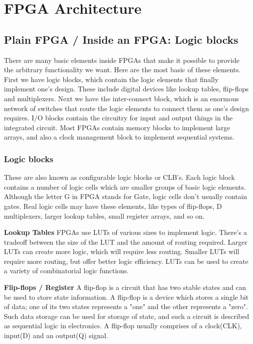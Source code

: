 \section{FPGA Architecture}


\subsection{Plain FPGA / Inside an FPGA: Logic blocks}

There are many basic elements inside FPGAs that make it possible to provide the arbitrary functionality we want. Here are the most basic of these elements. First we have logic blocks, which contain the logic elements that finally implement one's design. These include digital devices like lookup tables, flip-flops and multiplexers. Next we have the inter-connect block, which is an enormous network of switches that route the logic elements to connect them as one's design requires. I/O blocks contain the circuitry for input and output things in the integrated circuit. Most FPGAs contain memory blocks to implement large arrays, and also a clock management block to implement sequential systems. 

\subsubsection{Logic blocks} 
These are also known as configurable logic blocks or CLB's. Each logic block contains a number of logic cells which are smaller groups of basic logic elements. Although the letter G in FPGA stands for Gate, logic cells don't usually contain gates. Real logic cells may have these elements, like types of flip-flops, D multiplexers, larger lookup tables, small register arrays, and so on.\\

\par \textbf{Lookup Tables} FPGAs use LUTs of various sizes to implement logic. There's a tradeoff between the size of the LUT and the amount of routing required. Larger LUTs can create more logic, which will require less routing. Smaller LUTs will require more routing, but offer better logic efficiency. LUTs can be used to create a variety of combinatorial logic functions.

\textbf{Flip-flops / Register} A flip-flop is a circuit that has two stable states and can be used to store state information. A flip-flop is a device which stores a single bit of data; one of its two states represents a "one" and the other represents a "zero". Such data storage can be used for storage of state, and such a circuit is described as sequential logic in electronics. A flip-flop usually comprises of a clock(CLK), input(D) and an output(Q) signal.

